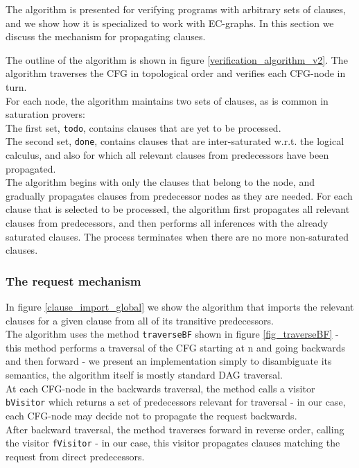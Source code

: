 The algorithm is presented for verifying programs with arbitrary sets of clauses, and we show how it is specialized to work with EC-graphs. In this section we discuss the mechanism for propagating clauses.

The outline of the algorithm is shown in figure \ref{verification_algorithm_v2}. 
The algorithm traverses the CFG in topological order and verifies each CFG-node in turn.\\
For each node, the algorithm maintains two sets of clauses, as is common in saturation provers:\\
The first set, \lstinline|todo|, contains clauses that are yet to be processed.\\
The second set, \lstinline|done|, contains clauses that are inter-saturated w.r.t. the logical calculus, 
and also for which all relevant clauses from predecessors have been propagated.\\
The algorithm begins with only the clauses that belong to the node, and gradually propagates clauses from predecessor nodes as they are needed.
For each clause that is selected to be processed, the algorithm first propagates all relevant clauses from predecessors, 
and then performs all inferences with the already saturated clauses.
The process terminates when there are no more non-saturated clauses.

\subsubsection*{The request mechanism}
In figure \ref{clause_import_global} we show the algorithm that imports the relevant clauses for a given clause from all of its transitive predecessors.\\
The algorithm uses the method \lstinline|traverseBF| shown in figure \ref{fig_traverseBF} - 
this method performs a traversal of the CFG starting at n and going backwards and then forward - we present an implementation simply to disambiguate its semantics, the algorithm itself is mostly standard DAG traversal.\\
At each CFG-node in the backwards traversal, the method calls a visitor \\
\lstinline|bVisitor| which returns a set of predecessors relevant for traversal - in our case, each CFG-node may decide not to propagate the request backwards.\\
After backward traversal, the method traverses forward in reverse order, calling the visitor \lstinline|fVisitor| - in our case, this visitor propagates clauses matching the request from direct predecessors.


